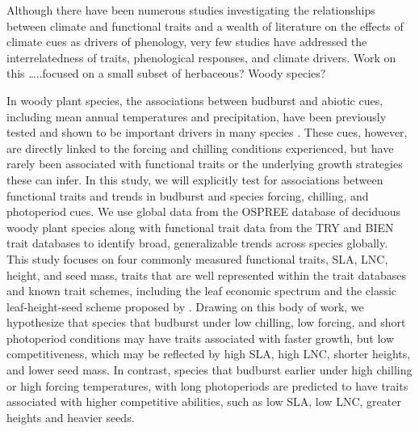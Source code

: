 \documentclass{article}\usepackage[]{graphicx}\usepackage[]{color}
\begin{document}
Although there have been numerous studies investigating the relationships between climate and functional traits and a wealth of literature on the effects of climate cues as drivers of phenology, very few studies have addressed the interrelatedness of traits, phenological responses, and climate drivers. Work on this …..focused on a small subset of herbaceous? Woody species?

In woody plant species, the associations between budburst and abiotic cues, including mean annual temperatures and precipitation, have been previously tested and shown to be important drivers in many species \citep{citation}. These cues, however, are directly linked to the forcing and chilling conditions experienced, but have rarely been associated with functional traits or the underlying growth strategies these can infer.  In this study, we will explicitly test for associations between functional traits and trends in budburst and species forcing, chilling, and photoperiod cues. We use global data from the OSPREE database of deciduous woody plant species along with functional trait data from the TRY and BIEN trait databases to identify broad, generalizable trends across species globally. This study focuses on four commonly measured functional traits, SLA, LNC, height, and seed mass, traits that are well represented within the trait databases and known trait schemes, including the leaf economic spectrum \citep{Wright2004} and the classic leaf-height-seed scheme proposed by \cite{Westoby1998}. Drawing on this body of work, we hypothesize that species that budburst under low chilling, low forcing, and short photoperiod conditions may have traits associated with faster growth, but low competitiveness, which may be reflected by high SLA, high LNC, shorter heights, and lower seed mass. In contrast, species that budburst earlier under high chilling or high forcing temperatures, with long photoperiods are predicted to have traits associated with higher competitive abilities, such as low SLA, low LNC, greater heights and heavier seeds. 

\pagebreak
% 

\end{document}
